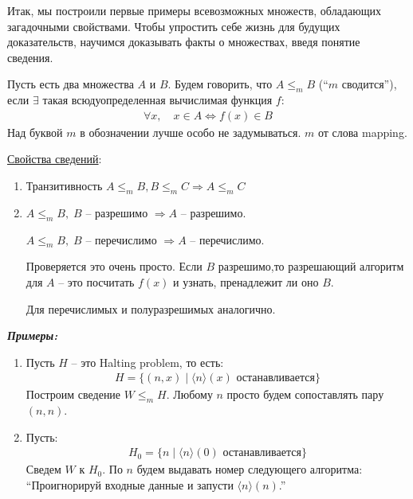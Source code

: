 Итак, мы построили первые примеры всевозможных множеств, обладающих загадочными свойствами. Чтобы упростить себе жизнь для будущих доказательств, научимся доказывать факты о множествах, введя понятие сведения. 
\begin{conj}
    Пусть есть два множества $A$ и $B$. Будем говорить, что $A \leqslant_m B$ (``$m$ сводится''), если $\exists$ такая всюдуопределенная вычислимая функция $f$:
    \begin{gather*}
        \forall x, \quad x \in A \Longleftrightarrow f(x) \in B
    \end{gather*} 
    Над буквой $m$ в обозначении лучше особо не задумываться. $m$ от слова mapping.  
\end{conj}

\underline{Свойства сведений}:
\begin{enumerate}
    \item Транзитивность \qquad $A \leqslant_m B, B \leqslant_m C \Longrightarrow A \leqslant_m C$
    \item $A \leqslant_m B, \; B$ -- разрешимо $\Longrightarrow A$ -- разрешимо. 
    
    $A \leqslant_m B, \; B$ -- перечислимо $\Longrightarrow A$ -- перечислимо.  

    Проверяется это очень просто. Если $B$ разрешимо,то разрешающий алгоритм для $A$ -- это посчитать $f(x)$ и узнать, пренадлежит ли оно $B$. 

    Для перечислимых и полуразрешимых аналогично.
\end{enumerate}

\textit{\textbf{Примеры:}}

\begin{enumerate}
    \item Пусть $H$ -- это Halting problem, то есть:
    \begin{gather*}
        H = \{ (n, x) \mid \langle n \rangle (x) \text{ останавливается} \}
    \end{gather*}
    Построим сведение $W \leqslant_m H$. Любому $n$ просто будем сопоставлять пару $(n, n)$. 
    \item Пусть:
    \begin{gather*}
        H_0 = \{ n \mid \langle n \rangle (0) \text{ останавливается} \}
    \end{gather*}
    Сведем $W$ к $H_0$. По $n$ будем выдавать номер следующего алгоритма: ``Проигнорируй входные данные и запусти $\langle n \rangle (n)$.''
\end{enumerate}
